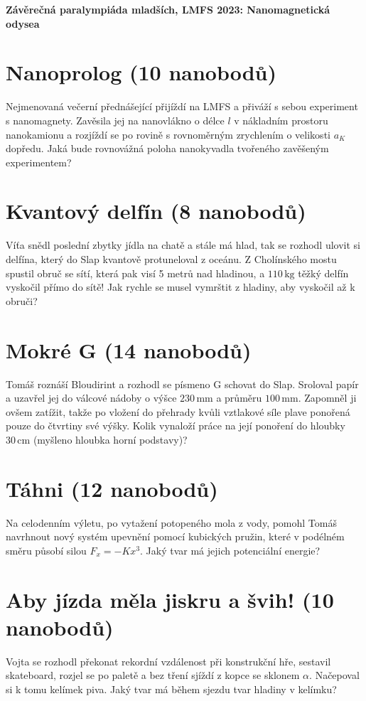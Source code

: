 \documentclass[10pt,a4paper,landscape]{article}
\author{Ondřej Zelenka}
\begin{document}
\pagestyle{empty}
\textbf{\center\LARGE Závěrečná paralympiáda mladších, LMFS 2023: Nanomagnetická odysea}

\begin{multicols}{2}[]

\section{Nanoprolog (10 nanobodů)}
Nejmenovaná večerní přednášející přijíždí na LMFS a přiváží s sebou experiment s nanomagnety. Zavěsila jej na nanovlákno o délce $l$ v nákladním prostoru nanokamionu a rozjíždí se po rovině s rovnoměrným zrychlením o velikosti $a_K$ dopředu. Jaká bude rovnovážná poloha nanokyvadla tvořeného zavěšeným experimentem?

\section{Kvantový delfín (8 nanobodů)}
Víťa snědl poslední zbytky jídla na chatě a stále má hlad, tak se rozhodl ulovit si delfína, který do Slap kvantově protuneloval z oceánu. Z Cholínského mostu spustil obruč se sítí, která pak visí 5 metrů nad hladinou, a $110\,\mathrm{kg}$ těžký delfín vyskočil přímo do sítě! Jak rychle se musel vymrštit z hladiny, aby vyskočil až k obruči?

\section{Mokré G (14 nanobodů)}
Tomáš roznáší Bloudirint a rozhodl se písmeno G schovat do Slap. Sroloval papír a uzavřel jej do válcové nádoby o výšce $230\,\mathrm{mm}$ a průměru $100\,\mathrm{mm}$. Zapomněl ji ovšem zatížit, takže po vložení do přehrady kvůli vztlakové síle plave ponořená pouze do čtvrtiny své výšky. Kolik vynaloží práce na její ponoření do hloubky $30\,\mathrm{cm}$ (myšleno hloubka horní podstavy)?

\section{Táhni (12 nanobodů)}
Na celodenním výletu, po vytažení potopeného mola z vody, pomohl Tomáš navrhnout nový systém upevnění pomocí kubických pružin, které v podélném směru působí silou $F_x = -Kx^3$. Jaký tvar má jejich potenciální energie?

\section{Aby jízda měla jiskru a švih! (10 nanobodů)}
Vojta se rozhodl překonat rekordní vzdálenost při konstrukční hře, sestavil skateboard, rozjel se po paletě a bez tření sjíždí z kopce se sklonem $\alpha$. Načepoval si k tomu kelímek piva. Jaký tvar má během sjezdu tvar hladiny v kelímku?


\end{multicols}
\end{document}

